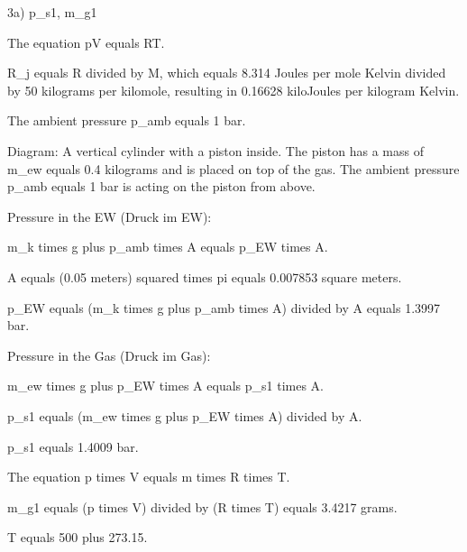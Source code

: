 3a) p_s1, m_g1

The equation pV equals RT.

R_j equals R divided by M, which equals 8.314 Joules per mole Kelvin divided by 50 kilograms per kilomole, resulting in 0.16628 kiloJoules per kilogram Kelvin.

The ambient pressure p_amb equals 1 bar.

Diagram: A vertical cylinder with a piston inside. The piston has a mass of m_ew equals 0.4 kilograms and is placed on top of the gas. The ambient pressure p_amb equals 1 bar is acting on the piston from above.

Pressure in the EW (Druck im EW):

m_k times g plus p_amb times A equals p_EW times A.

A equals (0.05 meters) squared times pi equals 0.007853 square meters.

p_EW equals (m_k times g plus p_amb times A) divided by A equals 1.3997 bar.

Pressure in the Gas (Druck im Gas):

m_ew times g plus p_EW times A equals p_s1 times A.

p_s1 equals (m_ew times g plus p_EW times A) divided by A.

p_s1 equals 1.4009 bar.

The equation p times V equals m times R times T.

m_g1 equals (p times V) divided by (R times T) equals 3.4217 grams.

T equals 500 plus 273.15.